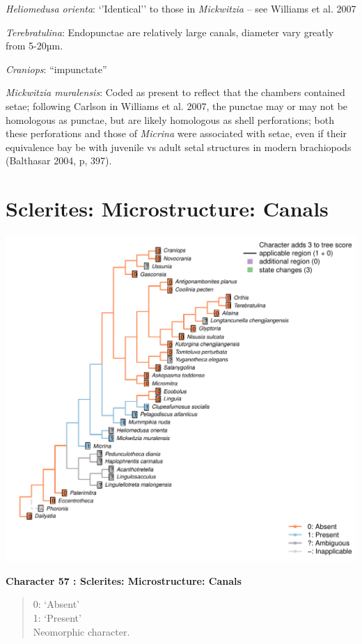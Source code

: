 \documentclass[]{book}
\theoremstyle{definition}
\theoremstyle{definition}
\theoremstyle{definition}
\theoremstyle{remark}
\begin{document}
\emph{Heliomedusa orienta}: `'Identical'' to those in \emph{Mickwitzia}
-- see Williams et al. 2007

\emph{Terebratulina}: Endopunctae are relatively large canals, diameter
vary greatly from 5-20µm.

\emph{Craniops}: ``impunctate''

\emph{Mickwitzia muralensis}: Coded as present to reflect that the
chambers contained setae; following Carlson in Williams et al. 2007, the
punctae may or may not be homologous as punctae, but are likely
homologous as shell perforations; both these perforations and those of
\emph{Micrina} were associated with setae, even if their equivalence bay
be with juvenile vs adult setal structures in modern brachiopods
(Balthasar 2004, p, 397).

\hypertarget{sclerites-microstructure-canals}{%
\section*{Sclerites: Microstructure:
Canals}\label{sclerites-microstructure-canals}}

\includegraphics{Brachiopod_phylogeny_files/figure-latex/unnamed-chunk-5-57.pdf}

\textbf{Character 57 : Sclerites: Microstructure: Canals }

\begin{quote}
0: `Absent'\\
1: `Present'\\
Neomorphic character.
\end{quote}
\end{document}
